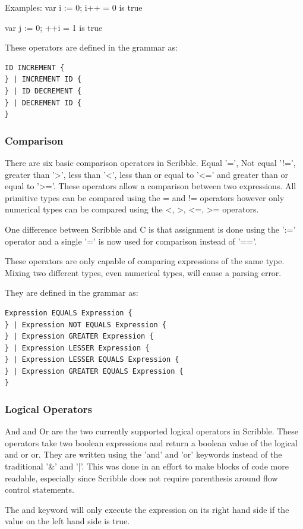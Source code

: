\documentclass[]{final_report}
\begin{document}
Examples:
var i := 0;
i++ = 0 is true

var j := 0;
++i = 1 is true

These operators are defined in the grammar as:
\begin{verbatim}
ID INCREMENT {
} | INCREMENT ID {
} | ID DECREMENT {
} | DECREMENT ID {
}
\end{verbatim}

\subsubsection{Comparison}

There are six basic comparison operators in Scribble. Equal '=', Not equal '!=', greater than '>', less than '<', less than or equal to '<=' and greater than or equal to '>='. These operators allow a comparison between two expressions. All primitive types can be compared using the = and != operators however only numerical types can be compared using the <, >, <=, >= operators.

One difference between Scribble and C is that assignment is done using the ':=' operator and a single '=' is now used for comparison instead of '=='.

These operators are only capable of comparing expressions of the same type. Mixing two different types, even numerical types, will cause a parsing error.

They are defined in the grammar as:\begin{verbatim}
Expression EQUALS Expression {
} | Expression NOT EQUALS Expression {
} | Expression GREATER Expression {
} | Expression LESSER Expression {
} | Expression LESSER EQUALS Expression {
} | Expression GREATER EQUALS Expression {
}
\end{verbatim}

\subsubsection{Logical Operators}

And and Or are the two currently supported logical operators in Scribble. These operators take two boolean expressions and return a boolean value of the logical and or or. They are written using the 'and' and 'or' keywords instead of the traditional '\&' and '|'. This was done in an effort to make blocks of code more readable, especially since Scribble does not require parenthesis around flow control statements.

The and keyword will only execute the expression on its right hand side if the value on the left hand side is true.
\end{document}

